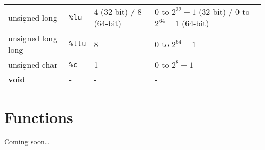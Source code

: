 \documentclass[
]{article}
\begin{document}
\begin{longtable}[]{@{}llll@{}}
\begin{minipage}[t]{0.14\columnwidth}\raggedright
unsigned long\strut
\end{minipage} & \begin{minipage}[t]{0.13\columnwidth}\raggedright
\texttt{\%lu}\strut
\end{minipage} & \begin{minipage}[t]{0.19\columnwidth}\raggedright
4 (32-bit) / 8 (64-bit)\strut
\end{minipage} & \begin{minipage}[t]{0.43\columnwidth}\raggedright
0 to \(2^{32}-1\) (32-bit) / 0 to \(2^{64} - 1\) (64-bit)\strut
\end{minipage}\tabularnewline
\begin{minipage}[t]{0.14\columnwidth}\raggedright
unsigned long long\strut
\end{minipage} & \begin{minipage}[t]{0.13\columnwidth}\raggedright
\texttt{\%llu}\strut
\end{minipage} & \begin{minipage}[t]{0.19\columnwidth}\raggedright
8\strut
\end{minipage} & \begin{minipage}[t]{0.43\columnwidth}\raggedright
0 to \(2^{64}-1\)\strut
\end{minipage}\tabularnewline
\begin{minipage}[t]{0.14\columnwidth}\raggedright
unsigned char\strut
\end{minipage} & \begin{minipage}[t]{0.13\columnwidth}\raggedright
\texttt{\%c}\strut
\end{minipage} & \begin{minipage}[t]{0.19\columnwidth}\raggedright
1\strut
\end{minipage} & \begin{minipage}[t]{0.43\columnwidth}\raggedright
0 to \(2^{8}-1\)\strut
\end{minipage}\tabularnewline
\begin{minipage}[t]{0.14\columnwidth}\raggedright
\textbf{void}\strut
\end{minipage} & \begin{minipage}[t]{0.13\columnwidth}\raggedright
-\strut
\end{minipage} & \begin{minipage}[t]{0.19\columnwidth}\raggedright
-\strut
\end{minipage} & \begin{minipage}[t]{0.43\columnwidth}\raggedright
-\strut
\end{minipage}\tabularnewline
\bottomrule
\end{longtable}

\hypertarget{functions}{%
\section{Functions}\label{functions}}

Coming soon\ldots{}
\end{document}

